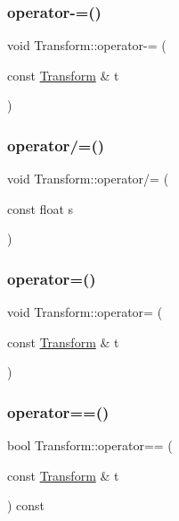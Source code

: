 \subsubsection{\texorpdfstring{operator-\/=()}{operator-=()}}
{\footnotesize\ttfamily void Transform\+::operator-\/= (\begin{DoxyParamCaption}\item[{const \mbox{\hyperlink{class_transform}{Transform}} \&}]{t }\end{DoxyParamCaption})}

\mbox{\label{class_transform_aa38455bbe5aed5f9dfd98a8d3b8a24ec}} 
\subsubsection{\texorpdfstring{operator/=()}{operator/=()}}
{\footnotesize\ttfamily void Transform\+::operator/= (\begin{DoxyParamCaption}\item[{const float}]{s }\end{DoxyParamCaption})}

\mbox{\label{class_transform_af1a25489903986022218a798e4f40251}} 
\subsubsection{\texorpdfstring{operator=()}{operator=()}}
{\footnotesize\ttfamily void Transform\+::operator= (\begin{DoxyParamCaption}\item[{const \mbox{\hyperlink{class_transform}{Transform}} \&}]{t }\end{DoxyParamCaption})}

\mbox{\label{class_transform_a0a2d49f8c1b9a2229846534f9bcc63d4}} 
\subsubsection{\texorpdfstring{operator==()}{operator==()}}
{\footnotesize\ttfamily bool Transform\+::operator== (\begin{DoxyParamCaption}\item[{const \mbox{\hyperlink{class_transform}{Transform}} \&}]{t }\end{DoxyParamCaption}) const}

